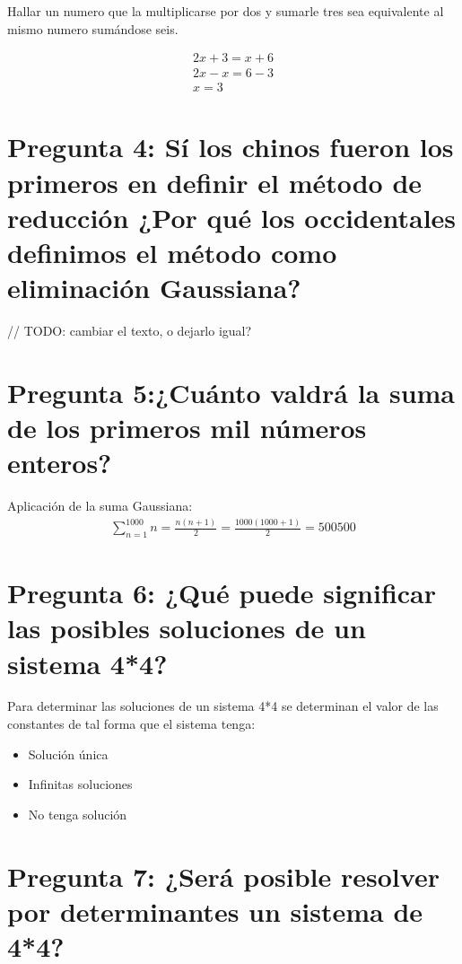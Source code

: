 \documentclass[a4paper, apacite, 12pt, doc]{apa6}
\begin{document}
Hallar un numero que la multiplicarse por dos y sumarle tres sea equivalente al mismo numero sumándose seis.

\begin{gather*}
	2x +3 = x + 6 \\
	2x -x = 6 -3 \\
	x = 3
\end{gather*}
\section{Pregunta 4: Sí los chinos fueron los primeros en definir el método de reducción ¿Por qué los occidentales definimos el método como eliminación Gaussiana?}

// TODO: cambiar el texto, o dejarlo igual?


\section{Pregunta 5:¿Cuánto valdrá la suma de los primeros mil números enteros?}
Aplicación de la suma Gaussiana:
\begin{gather*}
	\sum_{n=1}^{1000} n = \frac{n(n+1)}{2} =\frac{1000(1000 + 1)}{2}= 500500
\end{gather*}



\section{Pregunta 6: ¿Qué puede significar las posibles soluciones de un sistema 4*4?}

Para determinar las soluciones de un sistema 4*4 se determinan el valor de las constantes de tal forma que el sistema tenga:

\begin{itemize}
	\item Solución única
	\item Infinitas soluciones
	\item No tenga solución
\end{itemize}

\section{Pregunta 7: ¿Será posible resolver por determinantes un sistema de 4*4?}
\end{document}
